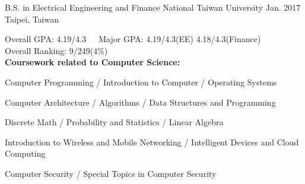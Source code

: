 

\begin{cventries}

  \cventry
    {B.S. in Electrical Engineering and Finance} %
    {National Taiwan University} %
    {Jan. 2017} %
    {Taipei, Taiwan} %
    {%
      \begin{cvdesc}
        Overall GPA: 4.19/4.3~~~Major GPA: 4.19/4.3(EE) 4.18/4.3(Finance) \\
        Overall Ranking: 9/249(4\%) \\
        \textbf{
          Coursework related to Computer Science:
        }
      \end{cvdesc}
      \vspace{8mm}
      \begin{cvitems}
        \item {Computer Programming / Introduction to Computer / Operating Systems}
        \item {Computer Architecture / Algorithms / Data Structures and Programming}
        \item {Discrete Math / Probability and Statistics / Linear Algebra}
        \item {Introduction to Wireless and Mobile Networking / Intelligent Devices and Cloud Computing}
        \item {Computer Security / Special Topics in Computer Security}
      \end{cvitems}
    }%

\end{cventries}
